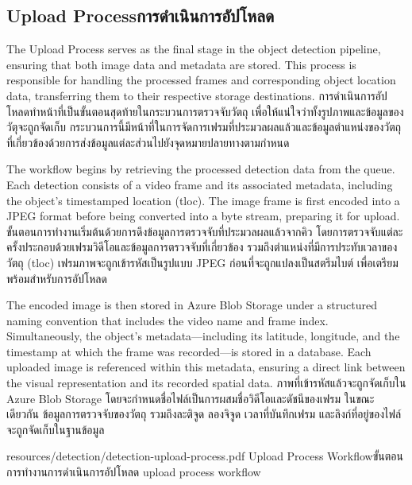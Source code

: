 \subsection{\ifenglish Upload Process\else การดำเนินการอัปโหลด\fi}
\ifenglish
The Upload Process serves as the final stage in the object detection pipeline, ensuring that both image data and metadata are stored. This process is responsible for handling the processed frames and corresponding object location data, transferring them to their respective storage destinations.
\else
การดำเนินการอัปโหลดทำหน้าที่เป็นขั้นตอนสุดท้ายในกระบวนการตรวจจับวัตถุ เพื่อให้แน่ใจว่าทั้งรูปภาพและข้อมูลของวัตุจะถูกจัดเก็บ กระบวนการนี้มีหน้าที่ในการจัดการเฟรมที่ประมวลผลแล้วและข้อมูลตำแหน่งของวัตถุที่เกี่ยวข้องด้วยการส่งข้อมูลแต่ละส่วนไปยังจุดหมายปลายทางตามกำหนด
\fi

\ifenglish
The workflow begins by retrieving the processed detection data from the queue. Each detection consists of a video frame and its associated metadata, including the object's timestamped location (tloc). The image frame is first encoded into a JPEG format before being converted into a byte stream, preparing it for upload.
\else
ขั้นตอนการทำงานเริ่มต้นด้วยการดึงข้อมูลการตรวจจับที่ประมวลผลแล้วจากคิว โดยการตรวจจับแต่ละครั้งประกอบด้วยเฟรมวิดีโอและข้อมูลการตรวจจับที่เกี่ยวข้อง รวมถึงตำแหน่งที่มีการประทับเวลาของวัตถุ (tloc) เฟรมภาพจะถูกเข้ารหัสเป็นรูปแบบ JPEG ก่อนที่จะถูกแปลงเป็นสตรีมไบต์ เพื่อเตรียมพร้อมสำหรับการอัปโหลด
\fi

\ifenglish
The encoded image is then stored in Azure Blob Storage under a structured naming convention that includes the video name and frame index. Simultaneously, the object's metadata—including its latitude, longitude, and the timestamp at which the frame was recorded—is stored in a database. Each uploaded image is referenced within this metadata, ensuring a direct link between the visual representation and its recorded spatial data.
\else
ภาพที่เข้ารหัสแล้วจะถูกจัดเก็บใน Azure Blob Storage โดยจะกำหนดชื่อไฟล์เป็นการผสมชื่อวิดีโอและดัชนีของเฟรม ในขณะเดียวกัน ข้อมูลการตรวจจับของวัตถุ รวมถึงละติจูด ลองจิจูด เวลาที่บันทึกเฟรม และลิงก์ที่อยู่ของไฟล์ จะถูกจัดเก็บในฐานข้อมูล 
\fi

\insertPDFfigure
{resources/detection/detection-upload-process.pdf}
{\ifenglish Upload Process Workflow\else ขั้นตอนการทำงานการดำเนินการอัปโหลด\fi}
{upload process workflow}